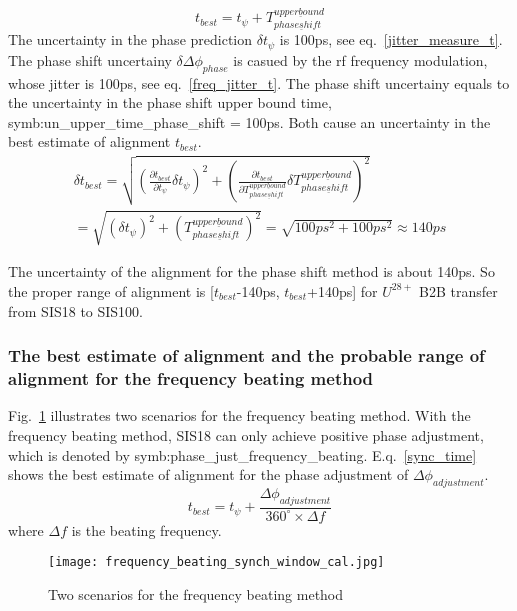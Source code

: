 \begin{equation}
t_{best} = t_{\psi} + T_{phase\underline shift}^{upper\underline bound} \label{Phase_win}
\end{equation}
The uncertainty in the phase prediction $\delta t_{\psi}$ is 100ps, see eq.~\ref{jitter_measure_t}. The phase shift uncertainy $\delta \Delta \phi_{phase}$ is casued by the rf frequency modulation, whose jitter is 100ps, see eq.~\ref{freq_jitter_t}. The phase shift uncertainy equals to the uncertainty in the phase shift upper bound time, \gls{symb:un_upper_time_phase_shift} = 100ps. Both cause an uncertainty in the best estimate of alignment $t_{best}$.
\begin{equation}
\begin{aligned}
\delta t_{best} =\sqrt {(\frac {\partial t_{best}}{\partial t_{\psi}}\delta t_{\psi})^2 + (\frac {\partial t_{best}}{\partial T_{phase\underline shift}^{upper\underline bound}}\delta T_{phase\underline shift}^{upper\underline bound})^2} \\
 =\sqrt {(\delta t_{\psi})^2+(T_{phase\underline shift}^{upper\underline bound})^2} =\sqrt { 100ps^2+100ps^2}\approx 140ps \label{Phase_uncertainty}
\end{aligned}
\end{equation}

The uncertainty of the alignment for the phase shift method is about 140ps. So the proper range of alignment is [$t_{best}$-140ps, $t_{best}$+140ps] for $U^{28+}$ B2B transfer from SIS18 to SIS100.
\subsubsection{The best estimate of alignment and the probable range of alignment for the frequency beating method}
Fig.~\ref{frequency_beating} illustrates two scenarios for the frequency beating method. With the frequency beating method, SIS18 can only achieve positive phase adjustment, which is denoted by \gls{symb:phase_just_frequency_beating}. E.q.~\ref{sync_time} shows the best estimate of alignment for the phase adjustment of $\Delta \phi_{adjustment}$.
\begin{equation}
	 t_{best} = t_{\psi}+\frac {\Delta \phi_{adjustment}}{{360^\circ} \times {\Delta f}} \label {sync_time}
   \end{equation}
where $\Delta f$ is the beating frequency.
\begin{figure}[!htb]
   \centering   
   \texttt{[image: frequency\_beating\_synch\_window\_cal.jpg]}
   \caption{Two scenarios for the frequency beating method}
   \label{frequency_beating}
\end{figure}

